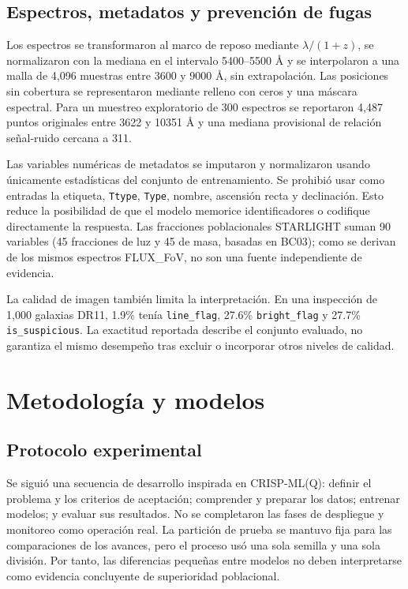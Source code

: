 \documentclass[letterpaper,11pt]{article}
\begin{document}
\subsection{Espectros, metadatos y prevención de fugas}

Los espectros se transformaron al marco de reposo mediante $\lambda/(1+z)$, se normalizaron con la mediana en el intervalo 5400--5500 \AA{} y se interpolaron a una malla de 4,096 muestras entre 3600 y 9000 \AA{}, sin extrapolación. Las posiciones sin cobertura se representaron mediante relleno con ceros y una máscara espectral. Para un muestreo exploratorio de 300 espectros se reportaron 4,487 puntos originales entre 3622 y 10351 \AA{} y una mediana provisional de relación señal-ruido cercana a 311.

Las variables numéricas de metadatos se imputaron y normalizaron usando únicamente estadísticas del conjunto de entrenamiento. Se prohibió usar como entradas la etiqueta, \texttt{Ttype}, \texttt{Type}, nombre, ascensión recta y declinación. Esto reduce la posibilidad de que el modelo memorice identificadores o codifique directamente la respuesta. Las fracciones poblacionales STARLIGHT suman 90 variables (45 fracciones de luz y 45 de masa, basadas en BC03); como se derivan de los mismos espectros FLUX\_FoV, no son una fuente independiente de evidencia.

La calidad de imagen también limita la interpretación. En una inspección de 1,000 galaxias DR11, 1.9\% tenía \texttt{line\_flag}, 27.6\% \texttt{bright\_flag} y 27.7\% \texttt{is\_suspicious}. La exactitud reportada describe el conjunto evaluado, no garantiza el mismo desempeño tras excluir o incorporar otros niveles de calidad.

\section{Metodología y modelos}

\subsection{Protocolo experimental}

Se siguió una secuencia de desarrollo inspirada en CRISP-ML(Q): definir el problema y los criterios de aceptación; comprender y preparar los datos; entrenar modelos; y evaluar sus resultados. No se completaron las fases de despliegue y monitoreo como operación real. La partición de prueba se mantuvo fija para las comparaciones de los avances, pero el proceso usó una sola semilla y una sola división. Por tanto, las diferencias pequeñas entre modelos no deben interpretarse como evidencia concluyente de superioridad poblacional.
\end{document}
